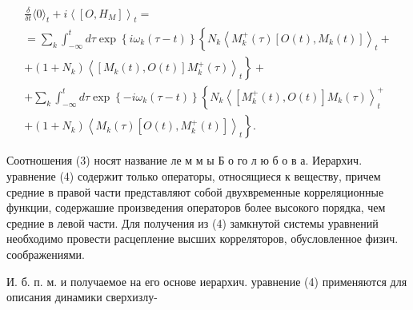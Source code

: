 \documentclass[10pt]{article}
\begin{document}
\[

\begin{gathered}

\frac{\delta}{\delta t}\langle 0\rangle_{t}+i\left\langle\left[O, H_{M}\right]\right\rangle_{t}= \\

=\sum_{k} \int_{-\infty}^{t} d \tau \exp \left\{i \omega_{k}(\tau-t)\right\}\left\{N_{k}\left\langle M_{k}^{+}(\tau)\left[O(t), M_{k}(t)\right]\right\rangle_{t}+\right. \\

\left.+\left(1+N_{k}\right)\left\langle\left[M_{k}(t), O(t)\right] M_{k}^{+}(\tau)\right\rangle_{t}\right\}+ \\

+\sum_{k} \int_{-\infty}^{t} d \tau \exp \left\{-i \omega_{k}(\tau-t)\right\}\left\{N_{k}\left\langle\left[M_{k}^{+}(t), O(t)\right] M_{k}(\tau)\right\rangle_{t}^{+}\right. \\

\left.+\left(1+N_{k}\right)\left\langle M_{k}(\tau)\left[O(t), M_{k}^{+}(t)\right]\right\rangle_{t}\right\} .

\end{gathered}

\]



Соотношения (3) носят название ле м м ы Б о го л ю б о в а. Иерархич. уравнение (4) содержит только операторы, относящиеся к веществу, причем средние в правой части представляют собой двухвременные корреляционные функции, содержашие произведения операторов более высокого порядка, чем средние в левой части. Для получения из (4) замкнутой системы уравнений необходимо провести расцепление высших корреляторов, обусловленное физич. соображениями.



И. б. п. м. и получаемое на его основе иерархич. уравнение (4) применяются для описания динамики сверхизлу-
\end{document}
